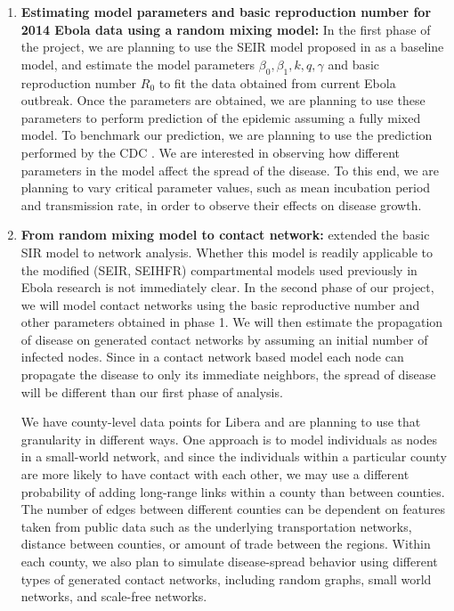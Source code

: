\documentclass[10pt, journal,onecolumn]{IEEEtran}
\begin{document}
\begin{enumerate}

\item \textbf{Estimating model parameters and basic reproduction number for 2014 Ebola data using a random mixing model:}
  In the first phase of the project, we are planning to use the SEIR model proposed in
  \citep{chowell2004basic} as a baseline model, and estimate the model parameters $\beta_0, \beta_1,
  k, q, \gamma$  and basic reproduction number $R_0$ to fit the data obtained from current Ebola
  outbreak. Once the parameters are obtained, we are planning to use these parameters to perform
  prediction of the epidemic assuming a fully mixed model. To benchmark our prediction, we are
  planning to use the prediction performed by the CDC \citep{meltzer2014estimating}. We are
  interested in observing how different parameters in the model affect the spread of the disease. To
  this end, we are planning to vary critical parameter values, such as mean incubation period and
  transmission rate, in order to observe their effects on disease growth.

\item \textbf{From random mixing model to contact network:} \citep{newman2002spread,
  meyers2005network} extended the basic SIR model to network analysis. Whether this model is readily
  applicable to the modified (SEIR, SEIHFR) compartmental models used previously in Ebola research
  \citep{chowell2004basic, legrand2007understanding} is not immediately clear. In the second phase of
  our project, we will model contact networks using the basic reproductive number and other
  parameters obtained in phase 1. We will then estimate the propagation of disease on generated
  contact networks by assuming an initial number of infected nodes. Since in a contact network based
  model each node can propagate the disease to only its immediate neighbors, the spread of disease
  will be different than our first phase of analysis.

  We have county-level data points for Libera and are planning to use that granularity in different ways.
  One approach is to model individuals as nodes in a small-world network, and
  since the individuals within a particular county are more likely to have contact with each other,
  we may use a different probability of adding long-range links within a county than between counties.
  The number of edges between different counties can be dependent on features taken from public data
  such as the underlying transportation networks, distance between counties,
  or amount of trade between the regions.
  Within each county, we also plan to simulate disease-spread behavior using different types of
  generated contact networks, including random graphs, small world networks, and scale-free
  networks.


\end{enumerate}
\end{document}
